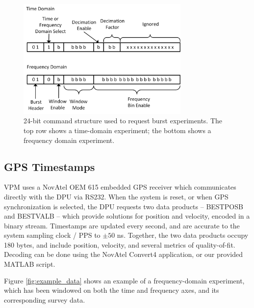 \begin{figure}[t]
\begin{center}
\includegraphics[width=20pc]{figures/vpm_figures/burst_commands.png}

\caption[24-bit command structure for burst experiments]{24-bit command structure used to request burst experiments. The top row shows a time-domain experiment; the bottom shows a frequency domain experiment.}
\label{fig:burst_commands}
\end{center}
\end{figure}


\subsection{GPS Timestamps}
VPM uses a NovAtel OEM 615 embedded GPS receiver which communicates directly with the DPU via RS232. When the system is reset, or when GPS synchronization is selected, the DPU requests two data products -- BESTPOSB and BESTVALB -- which provide solutions for position and velocity, encoded in a binary stream. Timestamps are updated every second, and are accurate to the system sampling clock / PPS to $\pm 50$ ns. Together, the two data products occupy 180 bytes, and include position, velocity, and several metrics of quality-of-fit. Decoding can be done using the NovAtel Convert4 application, or our provided MATLAB script.

Figure \ref{fig:example_data} shows an example of a frequency-domain experiment, which has been windowed on both the time and frequency axes, and its corresponding survey data.

